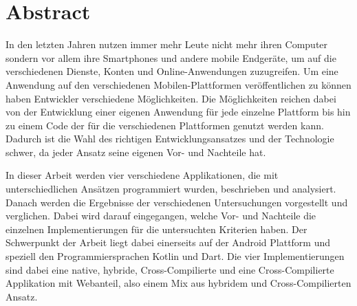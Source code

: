 \chapter*{Abstract}

\bigskip 

In den letzten Jahren nutzen immer mehr Leute nicht mehr ihren Computer sondern vor allem ihre Smartphones und andere mobile Endgeräte, um auf die verschiedenen Dienste, Konten und Online-Anwendungen zuzugreifen. Um eine Anwendung auf den verschiedenen Mobilen-Plattformen veröffentlichen zu können haben Entwickler verschiedene Möglichkeiten. Die Möglichkeiten reichen dabei von der Entwicklung einer eigenen Anwendung für jede einzelne Plattform bis hin zu einem Code der für die verschiedenen Plattformen genutzt werden kann. Dadurch ist die Wahl des richtigen Entwicklungsansatzes und der Technologie schwer, da jeder Ansatz seine eigenen Vor- und Nachteile hat. 

In dieser Arbeit werden vier verschiedene Applikationen, die mit unterschiedlichen Ansätzen programmiert wurden, beschrieben und analysiert. Danach werden die Ergebnisse der verschiedenen Untersuchungen vorgestellt und verglichen. Dabei wird darauf eingegangen, welche Vor- und Nachteile die einzelnen Implementierungen für die untersuchten Kriterien haben. Der Schwerpunkt der Arbeit liegt dabei einerseits auf der Android Plattform und speziell den Programmiersprachen Kotlin und Dart. Die vier Implementierungen sind dabei eine native, hybride, Cross-Compilierte und eine Cross-Compilierte Applikation mit Webanteil, also einem Mix aus hybridem und Cross-Compilierten Ansatz.